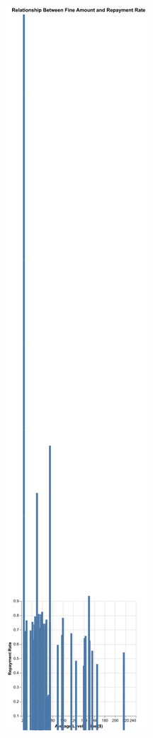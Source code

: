 \documentclass[
  letterpaper,
  DIV=11,
  numbers=noendperiod]{scrartcl}
\begin{document}
\includegraphics{ps2_final_files/figure-pdf/cell-21-output-3.png}
\end{document}
